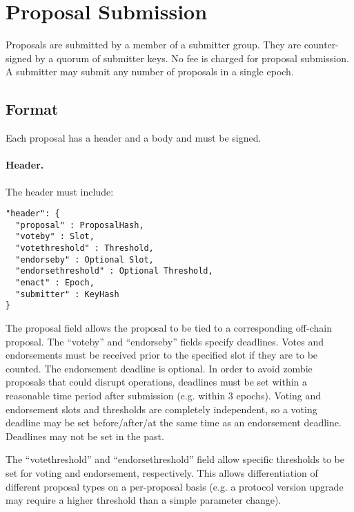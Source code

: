 \newpage
\section{Proposal Submission}
\label{sect:submission}

Proposals are submitted by a member of a submitter group.  They are counter-signed by a quorum of submitter keys.
No fee is charged for proposal submission.
A submitter may submit any number of proposals in a single epoch.

\subsection{Format}

Each proposal has a header and a body and must be signed.

\paragraph{Header.} The header must include:

\begin{verbatim}
"header": {
  "proposal" : ProposalHash,
  "voteby" : Slot,
  "votethreshold" : Threshold,
  "endorseby" : Optional Slot,
  "endorsethreshold" : Optional Threshold,
  "enact" : Epoch,
  "submitter" : KeyHash
}
\end{verbatim}

The proposal field allows the proposal to be tied to a corresponding off-chain proposal.  The ``voteby'' and ``endorseby'' fields specify deadlines.
Votes and endorsements must be received prior to the specified slot if they are to be counted.  The endorsement deadline is optional.
In order to avoid zombie proposals that could disrupt operations, deadlines must be set within a reasonable time period after submission (e.g. within 3 epochs).
Voting and endorsement slots and thresholds are completely independent, so a voting deadline may be set before/after/at the same time as an endorsement deadline.
Deadlines may not be set in the past.


The ``votethreshold'' and ``endorsethreshold'' field allow specific thresholds to be set for voting and endorsement, respectively.  This allows differentiation of different proposal types on a per-proposal basis
(e.g. a protocol version upgrade may require a higher threshold than a simple parameter change).

